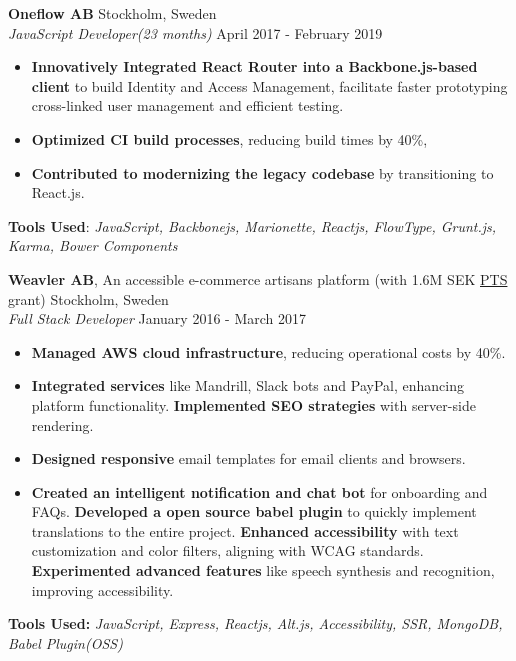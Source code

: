 \begin{minipage}[t]{0.61\textwidth}
\noindent
\textbf{Oneflow AB} \hfill Stockholm, Sweden\\
\textit{JavaScript Developer(23 months)} \hfill April 2017 - February 2019
\begin{itemize}
\setlength{\itemsep}{0.5em}
    \item \textbf{Innovatively Integrated React Router into a Backbone.js-based client} to build Identity and Access Management, facilitate faster prototyping cross-linked user management and efficient testing.
    \item \textbf{Optimized CI build processes}, reducing build times by 40\%,
    \item \textbf{Contributed to modernizing the legacy codebase} by transitioning to React.js.
\end{itemize}
\vspace{0.2em}
\textbf{ Tools Used}: \textit{JavaScript, Backbonejs, Marionette, Reactjs, FlowType, Grunt.js, Karma, Bower Components}

\vspace{1em}

\noindent
\textbf{\Large Weavler AB}, An accessible e-commerce artisans platform (with 1.6M SEK \href{https://pts.se}{\color{blue}PTS} grant) \hfill Stockholm, Sweden\\
\textit{Full Stack Developer} \hfill January 2016 - March 2017
\begin{itemize}
\setlength{\itemsep}{0.5em}
    \item \textbf{Managed AWS cloud infrastructure}, reducing operational costs by 40\%.
    \item \textbf{Integrated services} like Mandrill, Slack bots and PayPal, enhancing platform functionality.
    \textbf{Implemented SEO strategies} with server-side rendering.     \item \textbf{Designed responsive} email templates for email clients and browsers.

    \item \textbf{Created an intelligent notification and chat bot} for onboarding and FAQs.
    \textbf{Developed a open source babel plugin} to quickly implement translations to the entire project.
    \textbf{Enhanced accessibility} with text customization and color filters, aligning with WCAG standards.
    \textbf{Experimented advanced features} like speech synthesis and recognition, improving accessibility.
\end{itemize}
\vspace{0.2em}
\textbf{ Tools Used:} \textit{JavaScript, Express, Reactjs, Alt.js, Accessibility, SSR, MongoDB, Babel Plugin(OSS)}


\end{minipage}
